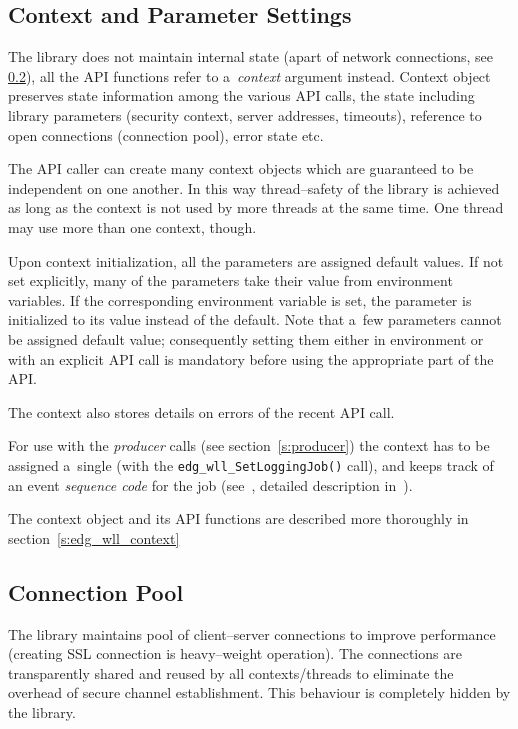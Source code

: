 \subsection{Context and Parameter Settings}
\label{s:context}

The \LB library does not maintain internal state (apart of network connections, see \ref{s:pool}), all the API
functions refer to a~\emph{context} argument instead.
Context object preserves state information among the various API
calls, the state including \LB library parameters (\eg security
context, server addresses, timeouts), reference to open connections
(connection pool), error state etc.

The API caller can create many context objects which are guaranteed
to be independent on one another. In this way thread--safety of the
library is achieved as long as the context is not used by more threads
at the same time. One thread may use more than one context, though.

Upon context initialization, all the parameters are assigned default
values. If not set explicitly, many of the parameters take their
value from environment variables. If the corresponding environment
variable is set, the parameter is initialized to its value instead of
the default. Note that a~few parameters cannot be assigned default
value; consequently setting them either in environment or with an
explicit API call is mandatory before using the appropriate part of
the API.

The context also stores details on errors of the recent API call.

For use with the \emph{producer} calls (see section~\ref{s:producer})
the context has to be assigned a~single \jobid (with the
\verb'edg_wll_SetLoggingJob()' call), and keeps track of an event
\emph{sequence code} for the job (see~\cite{lbug}, detailed
description in~\cite{lbarch}).

The context object and its API functions are described more thoroughly
in section~\ref{s:edg_wll_context}

\subsection{Connection Pool}
\label{s:pool}
The \LB library maintains pool of client--server connections to
improve performance (creating SSL connection is heavy--weight
operation). The connections are transparently shared and reused by all
contexts/threads to eliminate the overhead of secure channel
establishment. This behaviour is completely hidden by the library.

